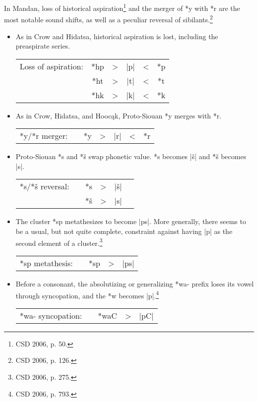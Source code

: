 \documentclass[output=paper]{LSP/langsci}
\begin{document}
In Mandan, loss of historical aspiration\footnote{CSD 2006, p. 50.} and the merger of *y with *r are the most notable sound shifts, as well as a peculiar reversal of sibilants.\footnote{CSD 2006, p. 126.}

\begin{itemize}
\item As in Crow and Hidatsa, historical aspiration is lost, including the preaspirate series.

\begin{center}
\begin{tabular}[t]{c c c c c c }
 Loss of aspiration: & *hp & > & |p| & < & *p \\
& *ht & >	 & |t| & < & *t \\
& *hk & > & |k| & < & *k \\
\end{tabular}
\end{center}

\item As in Crow, Hidatsa, and Hooc\k{a}k, Proto-Siouan *y merges with *r.
\begin{center}
\begin{tabular}[t]{c c c c c c c}
*y/*r merger: & & *y	 & > & |r| & < & *r
\end{tabular}
\end{center}
\item Proto-Siouan *s and *\v{s} swap phonetic value.  *s becomes |\v{s}| and *\v{s} becomes |s|.

\begin{center}
\begin{tabular}[t]{c c c c c c }
*s/*\v{s} reversal: & & *s & > & |\v{s}| \\
& & *\v{s} & > & |s| \\
\end{tabular}
\end{center}

\item The cluster *sp metathesizes to become |ps|. More generally, there seems to be a usual, but not quite complete, constraint against having |p| as the second element of a cluster.\footnote{CSD 2006, p. 275. }
\begin{center}
\begin{tabular}[t]{c c c c c}
*sp metathesis:	 & & *sp & > & |ps|
\end{tabular} 
\end{center}

\item Before a consonant, the absolutizing or generalizing *wa- prefix loses its vowel through syncopation, and the *w becomes |p|.\footnote{CSD 2006, p. 793.}
\begin{center}
\begin{tabular}[t]{c c c c c }
*wa- syncopation: & & *waC & > & |pC|
\end{tabular}
\end{center}
\end{itemize} 
\end{document}
